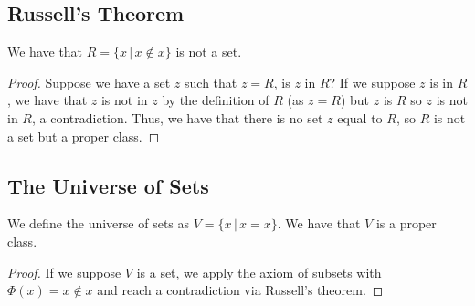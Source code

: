 \subsection{Russell's Theorem}

We have that $R = \{x \, | \, x \notin x\}$ is not a set.
\begin{proof}
    Suppose we have a set $z$ such that $z = R$, is $z$ in $R$?
    If we suppose $z$ is in $R$, we have that $z$ is not in $z$ by the definition
    of $R$ (as $z = R$) but $z$ is $R$ so $z$ is not in $R$, a contradiction.
    Thus, we have that there is no set $z$ equal to $R$, so $R$ is not a set
    but a proper class.
\end{proof}

\subsection{The Universe of Sets}

We define the universe of sets as $V = \{x \, | \, x = x\}$.
We have that $V$ is a proper class.
\begin{proof}
    If we suppose $V$ is a set, we apply the axiom of subsets with
    $\Phi(x) = x \notin x$ and reach a contradiction via Russell's
    theorem.
\end{proof}

